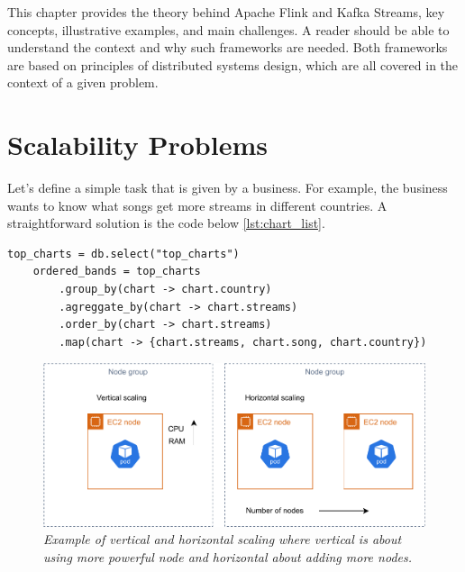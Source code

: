 This chapter provides the theory behind Apache Flink and Kafka Streams, key concepts,
illustrative examples, and main challenges.
A reader should be able to understand the context and why such frameworks are needed.
Both frameworks are based on principles of distributed systems design,
which are all covered in the context of a given problem.


\section{Scalability Problems}\label{subsec:simple-pip}
Let's define a simple task that is given by a business.
For example, the business wants to know what songs get more streams in different countries.
A straightforward solution is the code below \ref{lst:chart_list}.

\small
\begin{lstlisting}[label={lst:chart_list}]
    top_charts = db.select("top_charts")
    ordered_bands = top_charts
        .group_by(chart -> chart.country)
        .agreggate_by(chart -> chart.streams)
        .order_by(chart -> chart.streams)
        .map(chart -> {chart.streams, chart.song, chart.country})
\end{lstlisting}
\normalsize

\begin{figure}[H]
    \centering
    \includegraphics[width=1\textwidth]{figures/vertical-horizontal-scaling}
    \caption{\textit{Example of vertical and horizontal scaling where vertical is about using more powerful node
    and horizontal about adding more nodes.}}
    \label{fig:vert-hor-scal}
\end{figure}

